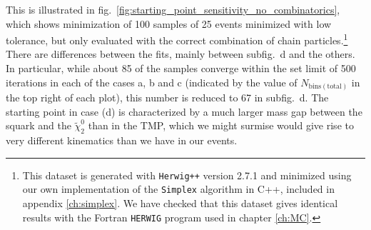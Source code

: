 \documentclass[twoside,english]{uiofysmaster}
\begin{document}
This is illustrated in fig.\ \ref{fig:starting_point_sensitivity_no_combinatorics}, which shows minimization of 100 samples of 25 events minimized with low tolerance, but only evaluated with the correct combination of chain particles.\footnote{This dataset is generated with {\tt Herwig++} version 2.7.1 \cite{Bahr:2008pv} and minimized using our own implementation of the {\tt Simplex} algorithm in C++, included in appendix \ref{ch:simplex}. 
We have checked that this dataset gives identical results with the Fortran {\tt HERWIG} program used in chapter \ref{ch:MC}.} There are differences between the fits, mainly between subfig.\ d and the others. In particular, while about 85 of the samples converge within the set limit of 500 iterations in each of the cases a, b and c (indicated by the value of $N_\mathrm{bins(total)}$ in the top right of each plot), this number is reduced to 67 in subfig.\ d. The starting point in case (d) is characterized by a much larger mass gap between the squark and the $\tilde\chi_2^0$ than in the TMP, which we might surmise would give rise to very different kinematics than we have in our events. 
\end{document}
